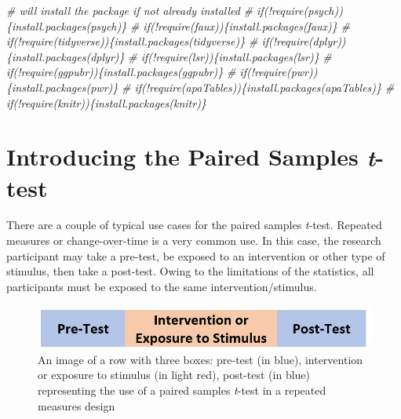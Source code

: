 \documentclass[
  11pt,
]{book}
\newenvironment{Shaded}{\begin{snugshade}}{\end{snugshade}}
\newcommand{\CommentTok}[1]{\textcolor[rgb]{0.56,0.35,0.01}{\textit{#1}}}
\begin{document}
\begin{Shaded}
\begin{Highlighting}[]
\CommentTok{\# will install the package if not already installed}
\CommentTok{\# if(!require(psych))\{install.packages(\textquotesingle{}psych\textquotesingle{})\}}
\CommentTok{\# if(!require(faux))\{install.packages(\textquotesingle{}faux\textquotesingle{})\}}
\CommentTok{\# if(!require(tidyverse))\{install.packages(\textquotesingle{}tidyverse\textquotesingle{})\}}
\CommentTok{\# if(!require(dplyr))\{install.packages(\textquotesingle{}dplyr\textquotesingle{})\}}
\CommentTok{\# if(!require(lsr))\{install.packages(\textquotesingle{}lsr\textquotesingle{})\}}
\CommentTok{\# if(!require(ggpubr))\{install.packages(\textquotesingle{}ggpubr\textquotesingle{})\}}
\CommentTok{\# if(!require(pwr))\{install.packages(\textquotesingle{}pwr\textquotesingle{})\}}
\CommentTok{\# if(!require(apaTables))\{install.packages(\textquotesingle{}apaTables\textquotesingle{})\}}
\CommentTok{\# if(!require(knitr))\{install.packages(\textquotesingle{}knitr\textquotesingle{})\}}
\end{Highlighting}
\end{Shaded}

\hypertarget{introducing-the-paired-samples-t-test}{%
\section{\texorpdfstring{Introducing the Paired Samples \emph{t}-test}{Introducing the Paired Samples t-test}}\label{introducing-the-paired-samples-t-test}}

There are a couple of typical use cases for the paired samples \emph{t}-test. Repeated measures or change-over-time is a very common use. In this case, the research participant may take a pre-test, be exposed to an intervention or other type of stimulus, then take a post-test. Owing to the limitations of the statistics, all participants must be exposed to the same intervention/stimulus.

\begin{figure}
\centering
\includegraphics{images/ttests/prepost_paired.jpg}
\caption{An image of a row with three boxes: pre-test (in blue), intervention or exposure to stimulus (in light red), post-test (in blue) representing the use of a paired samples \emph{t}-test in a repeated measures design}
\end{figure}
\end{document}

